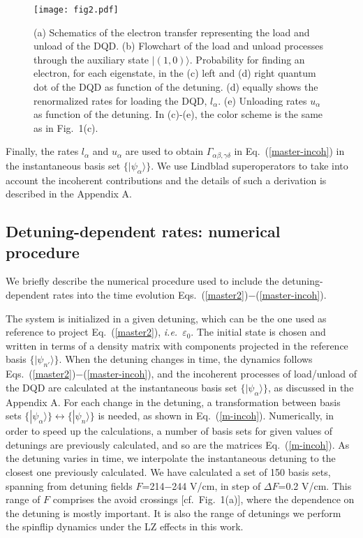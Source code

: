\documentclass[prb,twocolumn,showpacs,floats]{revtex4}
\begin{document}
\begin{figure}[htbp]
\texttt{[image: fig2.pdf]} 
\caption{
(a) Schematics of the electron transfer representing the load and unload of the DQD. 
(b) Flowchart of the load and unload processes through the auxiliary state $| (1,0) \rangle $.
Probability for finding an electron, for each eigenstate,
 in the (c) left and (d) right quantum dot of the DQD as function of the detuning. 
(d) equally shows the renormalized rates for loading the DQD,  $l_\alpha$. 
(e) Unloading rates $u_\alpha$ as function of the detuning.
In (c)-(e), the color scheme is the same as in Fig.~1(c).
} 

\end{figure}

Finally, the rates $l_\alpha$ and $u_\alpha$ are used to obtain $\Gamma_{\alpha\beta,\gamma\delta}$
in Eq.~(\ref{master-incoh}) in the instantaneous basis set $\{ | \psi_\alpha \rangle \}$.
We use Lindblad superoperators to take into account the incoherent contributions and the details of such a derivation is described in the
Appendix A.




\subsection{Detuning-dependent rates: numerical procedure }

We briefly describe the numerical procedure used to include the detuning-dependent rates
into the time evolution Eqs.~(\ref{master2})$-$(\ref{master-incoh}).

The system is initialized in a given detuning, which can be the one used as reference to
project Eq.~(\ref{master2}), \textit{i.e.}~$\varepsilon_0$. The initial state is chosen and written in terms of 
a density matrix with components projected in the reference basis $\{ | \psi_{n'} \rangle \}$.
When the detuning changes in time, the dynamics follows Eqs.~(\ref{master2})$-$(\ref{master-incoh}),
and the incoherent processes of load/unload of the DQD are calculated at the instantaneous
basis set $\{ | \psi_\alpha \rangle \}$, as discussed in the Appendix A. For each change
in the detuning, a transformation between basis sets
 $\{ | \psi_\alpha \rangle \} \leftrightarrow \{ | \psi_n \rangle \}$ is needed, as
shown in Eq.~(\ref{m-incoh}). Numerically, in order to speed up the calculations,
a number of basis sets for given values of detunings are previously calculated, and so are the matrices  Eq.~(\ref{m-incoh}).
As the detuning varies in time, we interpolate the instantaneous detuning to the closest one previously calculated.
We have calculated a set of 150 basis sets, spanning from detuning fields $F$=214$-$244 V/cm, in step of $\Delta F$=0.2 V/cm.
This range of $F$ comprises the avoid crossings [cf.~Fig.~1(a)], where the dependence on the detuning
is mostly important. It is also the range of detunings we perform the spinflip dynamics
under the LZ effects in this work.
\end{document}
